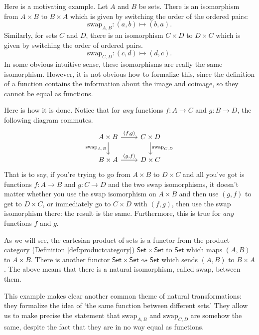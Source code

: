 \documentclass[a4paper]{report}
\theoremstyle{definition}
\theoremstyle{plain}
\theoremstyle{remark}
\begin{document}
Here is a motivating example. Let $A$ and $B$ be sets. There is an isomorphism from $A \times B$ to $B \times A$ which is given by switching the order of the ordered pairs:
\begin{equation*}
  \mathrm{swap}_{A, B}\colon (a, b) \mapsto (b, a).
\end{equation*}
Similarly, for sets $C$ and $D$, there is an isomorphism $C \times D$ to $D \times C$ which is given by switching the order of ordered pairs.
\begin{equation*}
  \mathrm{swap}_{C, D}\colon (c, d) \mapsto (d, c).
\end{equation*}
In some obvious intuitive sense, these isomorphisms are really the same isomorphism. However, it is not obvious how to formalize this, since the definition of a function contains the information about the image and coimage, so they cannot be equal as functions. 

Here is how it is done. Notice that for \emph{any} functions $f\colon A \to C$ and $g\colon B \to D$, the following diagram commutes.
\begin{equation*}
  \begin{tikzcd}
    A \times B
    \arrow[r, "{(f, g)}"]
    \arrow[d, swap, "{\text{swap}_{A, B}}"]
    & C \times D
    \arrow[d, "{\text{swap}_{C, D}}"]
    \\
    B \times A
    \arrow[r, "{(g, f)}"]
    & D \times C
  \end{tikzcd}
\end{equation*}
That is to say, if you're trying to go from $A \times B$ to $D \times C$ and all you've got is functions $f\colon A \to B$ and $g\colon C \to D$ and the two swap isomorphisms, it doesn't matter whether you use the swap isomorphism on $A \times B$ and then use $(g, f)$ to get to $D \times C$, or immediately go to $C \times D$ with $(f, g)$, then use the swap isomorphism there: the result is the same. Furthermore, this is true for \emph{any} functions $f$ and $g$.

As we will see, the cartesian product of sets is a functor from the product category (\hyperref[def:productcategory]{Definition \ref*{def:productcategory}}) $\mathsf{Set} \times \mathsf{Set}$ to $\mathsf{Set}$ which maps $(A, B)$ to $A \times B$. There is another functor $\mathsf{Set} \times \mathsf{Set} \rightsquigarrow \mathsf{Set}$ which sends $(A, B)$ to $B \times A$. The above means that there is a natural isomorphism, called $\mathrm{swap}$, between them.

This example makes clear another common theme of natural transformations: they formalize the idea of `the same function between different sets.' They allow us to make precise the statement that $\mathrm{swap}_{A, B}$ and $\mathrm{swap}_{C, D}$ are somehow the same, despite the fact that they are in no way equal as functions.
\end{document}
